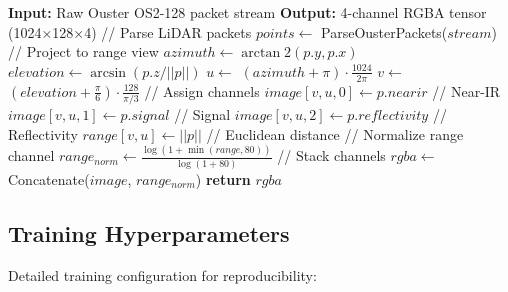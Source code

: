 \begin{algorithmic}[1]
\STATE \textbf{Input:} Raw Ouster OS2-128 packet stream
\STATE \textbf{Output:} 4-channel RGBA tensor (1024×128×4)
\STATE
\STATE // Parse LiDAR packets
\STATE $points \leftarrow$ ParseOusterPackets($stream$)
\STATE
\STATE // Project to range view
    \STATE $azimuth \leftarrow \arctan2(p.y, p.x)$
    \STATE $elevation \leftarrow \arcsin(p.z / ||p||)$
    \STATE $u \leftarrow$ $(azimuth + \pi) \cdot \frac{1024}{2\pi}$
    \STATE $v \leftarrow$ $(elevation + \frac{\pi}{6}) \cdot \frac{128}{\pi/3}$
    \STATE
    \STATE // Assign channels
    \STATE $image[v, u, 0] \leftarrow p.nearir$ // Near-IR
    \STATE $image[v, u, 1] \leftarrow p.signal$ // Signal  
    \STATE $image[v, u, 2] \leftarrow p.reflectivity$ // Reflectivity
    \STATE $range[v, u] \leftarrow ||p||$ // Euclidean distance
\ENDFOR
\STATE
\STATE // Normalize range channel
\STATE $range_{norm} \leftarrow \frac{\log(1 + \min(range, 80))}{\log(1 + 80)}$
\STATE
\STATE // Stack channels
\STATE $rgba \leftarrow$ Concatenate($image$, $range_{norm}$)
\STATE \textbf{return} $rgba$
\end{algorithmic}

\subsection{Training Hyperparameters}

Detailed training configuration for reproducibility:


